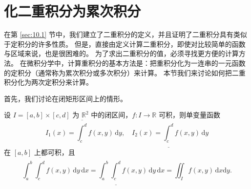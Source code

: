\section{化二重积分为累次积分}\label{sec:10.3}

在第 \ref{sec:10.1} 节中，我们建立了二重积分的定义，并且证明了二重积分具有类似于定积分的许多性质。
但是，直接由定义计算二重积分，即使对比较简单的函数与区域来说，也是很困难的。
为了求出二重积分的值，必须寻找更方便的计算方法。
在微积分学中，计算重积分的基本方法是：把重积分化为一连串的一元函数的定积分（通常称为累次积分或多次积分）来计算。
本节我们来讨论如何把二重积分化为两次定积分来计算。

首先，我们讨论在闭矩形区间上的情形。

\begin{theorem}\label{thm:10.3.1}
设 $I = [a, b] \times [c, d]$ 为 $\mathbb{R}^2$ 中的闭区间，$f\colon I \to \mathbb{R}$ 可积，则单变量函数
\[
I_1(x) = \overline{\int_c^d} f(x, y)\,\mathrm{d}y, \quad I_2(x) = \underline{\int_c^d} f(x, y)\,\mathrm{d}y
\]
在 $[a, b]$ 上都可积，且
\[
\int_a^b \overline{\int_c^d} f(x, y)\,\mathrm{d}y\,\mathrm{d}x = \int_a^b \underline{\int_c^d} f(x, y)\,\mathrm{d}y\,\mathrm{d}x = \iint_I f(x, y)\,\mathrm{d}x\mathrm{d}y.
\]
\end{theorem}

